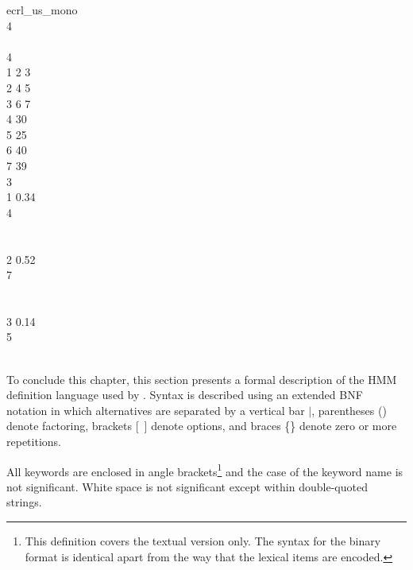 {
 \>  ecrl\_us\_mono \\
\>     4  \\
 \\
\>     4 \\
\>     1 2 3 \\
\>     2 4 5 \\
\>     3 6 7 \\
\>     4 30 \\
\>     5 25 \\
\>     6 40 \\
\>     7 39 \\
  3 \\
\>     1 0.34 \\
\>\>     4 \\
\>\>     \\   
\>\>     \\
\>     2 0.52 \\
\>\>     7 \\
\>\>     \\   
\>\>     \\
\>     3 0.14 \\
\>\>     5 \\
\>\>     \\   
\>\>    
}


To conclude this chapter,
this section presents a formal description
of the HMM definition language used by \HTK.
Syntax is described using an extended BNF notation in which
alternatives are separated by a vertical bar $|$, parentheses () denote
factoring, brackets [\ ] denote options, and braces \{\} denote zero or more
repetitions. 

All keywords are enclosed in angle brackets\footnote{
This definition covers the textual version only.  The syntax for
the binary format
is identical apart from the way that the lexical items are encoded.} and
the case of the
keyword name is not significant.
White space is not significant except within double-quoted strings.

